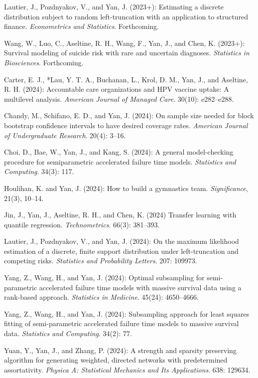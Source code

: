 \documentclass[Statistics]{vita}
\begin{document}
\begin{vita}
\begin{Publications}
\begin{RefereedJournalArticles}
  \item *Lautier, J., Pozdnyakov, V., and Yan, J. (2023+): Estimating a discrete distribution subject to random left-truncation with an application to structured finance. {\em Econometrics and Statistics\/}. Forthcoming. 
  \item *Wang, W., Luo, C., Aseltine, R. H., Wang, F., Yan, J., and Chen, K. (2023+): Survival modeling of suicide risk with rare and uncertain diagnoses. {\em Statistics in Biosciences\/}. Forthcoming.
  \item Carter, E. J., *Lau, Y. T. A., Buchanan, L., Krol, D. M., Yan, J., and Aseltine, R. H. (2024): Accountable care organizations and {HPV} vaccine uptake: A multilevel analysis. {\em American Journal of Managed Care\/}. 30(10): e282--e288.
  \item *Chandy, M., Schifano, E. D., and Yan, J. (2024): On sample size needed for block bootstrap confidence intervals to have desired coverage rates. {\em American Journal of Undergraduate Research\/}. 20(4): 3--16.
  \item Choi, D., Bae, W., Yan, J., and Kang, S. (2024): A general model-checking procedure for semiparametric accelerated failure time models. {\em Statistics and Computing\/}. 34(3): 117.
  \item *Houlihan, K. and Yan, J. (2024): How to build a gymnastics team. {\em Significance\/}, 21(3), 10--14. 
  \item *Jin, J., Yan, J., Aseltine, R. H., and Chen, K. (2024) Transfer learning with quantile regression. {\em Technometrics\/}. 66(3): 381--393.
  \item *Lautier, J., Pozdnyakov, V., and Yan, J. (2024): On the maximum likelihood estimation of a discrete, finite support distribution under left-truncation and competing risks. {\em Statistics and Probability Letters\/}. 207: 109973.
  \item *Yang, Z., Wang, H., and Yan, J. (2024): Optimal subsampling for semi-parametric accelerated failure time models with massive survival data using a rank-based approach. {\em Statistics in Medicine\/}. 45(24): 4650--4666.
  \item *Yang, Z., Wang, H., and Yan, J. (2024): Subsampling approach for least squares fitting of semi-parametric accelerated failure time models to massive survival data. {\em Statistics and Computing\/}. 34(2): 77.
  \item *Yuan, Y., Yan, J., and Zhang, P. (2024): A strength and sparsity preserving algorithm for generating weighted, directed networks with predetermined assortativity. {\em Physica A: Statistical Mechanics and Its Applications\/}. 638: 129634.

\end{RefereedJournalArticles}
\end{Publications}
\end{vita}
\end{document}
